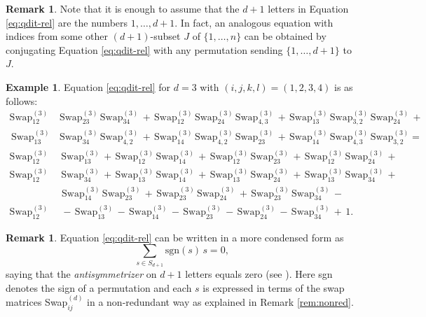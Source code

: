 \documentclass[12pt,dvipsnames,accepted=2016-08-18,a4paper,onecolumn]{quantumarticle}
\numberwithin{equation}{section}
\theoremstyle{definition}
\newtheorem{remark}[theorem]{Remark}
\newtheorem{example}[theorem]{Example}
\begin{document}
\begin{remark}
    Note that it is enough to assume that the $d+1$ letters in Equation \eqref{eq:qdit-rel} are the numbers $1,\ldots,d+1.$ In fact, an analogous equation with indices from some other $(d+1)$-subset  $J$ of $\{1,\ldots,n\}$ can be obtained by conjugating Equation \eqref{eq:qdit-rel} with any permutation sending $\{1,\ldots,d+1\}$ to $J.$
\end{remark}


\begin{example}
    Equation \eqref{eq:qdit-rel} for $d=3$  with $(i,j,k,l)=(1,2,3,4)$ is as follows:
\begin{equation*}\label{eq:swap-rel}
	\begin{split}
		\text{Swap}^{(3)}_{12}\,&\text{Swap}^{(3)}_{23}\,\text{Swap}^{(3)}_{34}\,  + \, \text{Swap}^{(3)}_{12}\,\text{Swap}^{(3)}_{24}\,\text{Swap}^{(3)}_{4,3}\,  + \, \text{Swap}^{(3)}_{13}\,\text{Swap}^{(3)}_{3,2}\,\text{Swap}^{(3)}_{24} \,  + \\ \, \text{Swap}^{(3)}_{13}\,&\text{Swap}^{(3)}_{34}\,\text{Swap}^{(3)}_{4,2} \,  + \, \text{Swap}^{(3)}_{14}\,\text{Swap}^{(3)}_{4,2}\,\text{Swap}^{(3)}_{23} \,  + \, \text{Swap}^{(3)}_{14}\,\text{Swap}^{(3)}_{4,3}\,\text{Swap}^{(3)}_{3,2}  = \\
		\text{Swap}^{(3)}_{12}&\,\text{Swap}^{(3)}_{13}\,  + \,\text{Swap}^{(3)}_{12}\,\text{Swap}^{(3)}_{14}\,  + \, \text{Swap}^{(3)}_{12}\,\text{Swap}^{(3)}_{23}\,  + \,\text{Swap}^{(3)}_{12}\,\text{Swap}^{(3)}_{24}\,  + \\ 
		\text{Swap}^{(3)}_{12}&\,\text{Swap}^{(3)}_{34}\,  + \, 
		\text{Swap}^{(3)}_{13}\,\text{Swap}^{(3)}_{14}\,  + \,\text{Swap}^{(3)}_{13}\,\text{Swap}^{(3)}_{24}\,  + \, \text{Swap}^{(3)}_{13}\,\text{Swap}^{(3)}_{34}\,  + \\
		& \ \text{Swap}^{(3)}_{14}\,\text{Swap}^{(3)}_{23}\,  + \, \text{Swap}^{(3)}_{23}\,\text{Swap}^{(3)}_{24}\,  + \, \text{Swap}^{(3)}_{23}\,\text{Swap}^{(3)}_{34}\,  - \\
		\text{Swap}^{(3)}_{12}&\,  - \,
		\text{Swap}^{(3)}_{13}\,  - \,\text{Swap}^{(3)}_{14}\,  - \,\text{Swap}^{(3)}_{23}\,  - \,\text{Swap}^{(3)}_{24}\,  - \,\text{Swap}^{(3)}_{34}\,  + \, 1.
	\end{split}
\end{equation*}
\end{example}

\begin{remark} 
Equation \eqref{eq:qdit-rel} can be written in a more condensed form as 
$$
\sum_{s \in S_{d+1}} \text{sgn}(s)\, s = 0,
$$
saying that the \textit{antisymmetrizer} on $d+1$ letters equals zero (see \cite[Section 9.3.1]{Probook}). Here sgn denotes the sign of a permutation and each $s$ is expressed in terms of the swap matrices Swap$^{(d)}_{ij}$ in a non-redundant way as explained in Remark \ref{rem:nonred}.
\end{remark}
\end{document}
